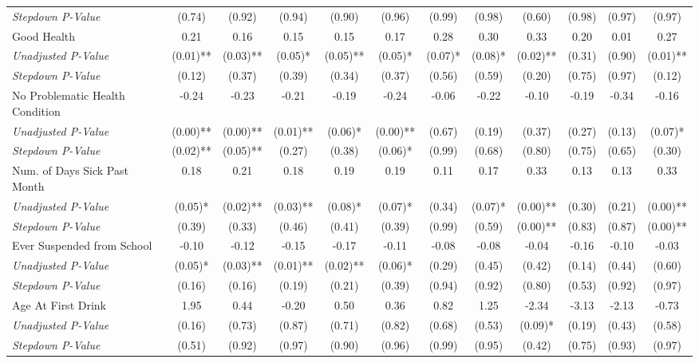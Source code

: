 \begin{tabular}{l c c c c c c c c c c c}
\quad \textit{Stepdown P-Value} & (0.74) & (0.92) & (0.94) & (0.90) & (0.96) & (0.99) & (0.98) & (0.60) & (0.98) & (0.97) & (0.97) \\
Good Health & 0.21 & 0.16 & 0.15 & 0.15 & 0.17 & 0.28 & 0.30 & 0.33 & 0.20 & 0.01 & 0.27 \\
\quad \textit{Unadjusted P-Value} & (0.01)** & (0.03)** & (0.05)* & (0.05)** & (0.05)* & (0.07)* & (0.08)* & (0.02)** & (0.31) & (0.90) & (0.01)** \\
\quad \textit{Stepdown P-Value} & (0.12) & (0.37) & (0.39) & (0.34) & (0.37) & (0.56) & (0.59) & (0.20) & (0.75) & (0.97) & (0.12) \\
No Problematic Health Condition & -0.24 & -0.23 & -0.21 & -0.19 & -0.24 & -0.06 & -0.22 & -0.10 & -0.19 & -0.34 & -0.16 \\
\quad \textit{Unadjusted P-Value} & (0.00)** & (0.00)** & (0.01)** & (0.06)* & (0.00)** & (0.67) & (0.19) & (0.37) & (0.27) & (0.13) & (0.07)* \\
\quad \textit{Stepdown P-Value} & (0.02)** & (0.05)** & (0.27) & (0.38) & (0.06)* & (0.99) & (0.68) & (0.80) & (0.75) & (0.65) & (0.30) \\
Num. of Days Sick Past Month & 0.18 & 0.21 & 0.18 & 0.19 & 0.19 & 0.11 & 0.17 & 0.33 & 0.13 & 0.13 & 0.33 \\
\quad \textit{Unadjusted P-Value} & (0.05)* & (0.02)** & (0.03)** & (0.08)* & (0.07)* & (0.34) & (0.07)* & (0.00)** & (0.30) & (0.21) & (0.00)** \\
\quad \textit{Stepdown P-Value} & (0.39) & (0.33) & (0.46) & (0.41) & (0.39) & (0.99) & (0.59) & (0.00)** & (0.83) & (0.87) & (0.00)** \\
Ever Suspended from School & -0.10 & -0.12 & -0.15 & -0.17 & -0.11 & -0.08 & -0.08 & -0.04 & -0.16 & -0.10 & -0.03 \\
\quad \textit{Unadjusted P-Value} & (0.05)* & (0.03)** & (0.01)** & (0.02)** & (0.06)* & (0.29) & (0.45) & (0.42) & (0.14) & (0.44) & (0.60) \\
\quad \textit{Stepdown P-Value} & (0.16) & (0.16) & (0.19) & (0.21) & (0.39) & (0.94) & (0.92) & (0.80) & (0.53) & (0.92) & (0.97) \\
Age At First Drink & 1.95 & 0.44 & -0.20 & 0.50 & 0.36 & 0.82 & 1.25 & -2.34 & -3.13 & -2.13 & -0.73 \\
\quad \textit{Unadjusted P-Value} & (0.16) & (0.73) & (0.87) & (0.71) & (0.82) & (0.68) & (0.53) & (0.09)* & (0.19) & (0.43) & (0.58) \\
\quad \textit{Stepdown P-Value} & (0.51) & (0.92) & (0.97) & (0.90) & (0.96) & (0.99) & (0.95) & (0.42) & (0.75) & (0.93) & (0.97) \\
\bottomrule
\end{tabular}
